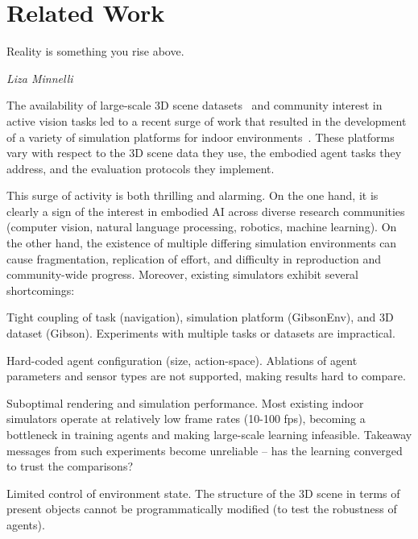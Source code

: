\section{Related Work}

\setlength{\epigraphwidth}{0.55\columnwidth}
\epigraph{Reality is something you rise above.}{\textit{Liza Minnelli}}

The availability of large-scale 3D scene datasets~\cite{armeni_cvpr16,Song2017,Chang2017} and community interest in active vision tasks led to a recent surge of work that resulted in the development of a variety of simulation platforms for indoor environments~\cite{Kolve2017,Brodeur2017,gupta_cvpr17,Savva2017,Wu2018,Anderson2018-Language,Xia2018,Yan2018,Puig2018}.
These platforms vary with respect to the 3D scene data they use, the embodied agent tasks they address, and the evaluation protocols they implement.

This surge of activity is both thrilling and alarming. On the one hand, it is clearly a sign of the interest in embodied AI across diverse research communities (computer vision, natural language processing, robotics, machine learning).
On the other hand, the existence of multiple differing simulation environments can cause fragmentation, replication of effort, and difficulty in reproduction and community-wide progress.
Moreover, existing simulators exhibit several shortcomings:
\begin{compactitem}[\hspace{1pt}--]
    \item Tight coupling of task (\eg navigation), simulation platform (\eg GibsonEnv), and 3D dataset (\eg Gibson). 
    Experiments with multiple tasks or datasets are impractical. 
    \item Hard-coded agent configuration (\eg size, action-space). Ablations of agent parameters and sensor types are not supported, making results hard to compare.
    \item Suboptimal rendering and simulation performance. Most existing indoor simulators operate at relatively low frame rates (10-100 fps), becoming a bottleneck in training agents and 
    making large-scale learning infeasible. Takeaway messages from such experiments 
    become unreliable -- has the learning converged to trust the comparisons? 
    \item Limited control of environment state. The structure of the 3D scene in terms of present objects cannot be programmatically modified (\eg to test the robustness of agents). 
\end{compactitem}

